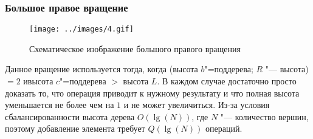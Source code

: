 \begin{frame}
    \frametitle{Большое правое вращение}

    \begin{figure}[ht]
        \texttt{[image: ../images/4.gif]}
        
        \caption{Схематическое изображение большого правого вращения}

    \end{figure}

    Данное вращение используется тогда, когда (высота $b$"=поддерева; $R$ "--- высота)
    $= 2$ ивысота $c$"=поддерева $ > $ высота $L$.
    В каждом случае достаточно просто доказать то, 
    что операция приводит к нужному результату и
    что полная высота уменьшается не более чем на $1$ и не может увеличиться.
    Из-за условия сбалансированности высота дерева $O(\lg(N))$,
    где $N$ "--- количество вершин, поэтому добавление элемента требует $Q(\lg(N))$ операций.
\end{frame}